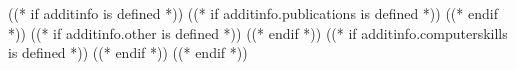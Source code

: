\documentclass[((( doc_options )))]{europasscv}
\begin{document}
\begin{europasscv}
((* if additinfo is defined *))
	((* if additinfo.publications is defined *))
	((* endif *))
	((* if additinfo.other is defined *))
	((* endif *))
	((* if additinfo.computerskills is defined *))
	((* endif *))
((* endif *))


\end{europasscv}
\end{document}
